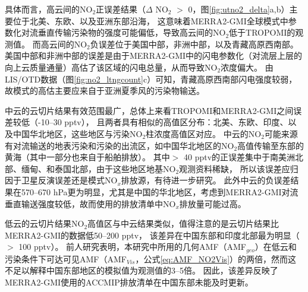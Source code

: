 具体而言，高云间的NO$_2$正误差结果（$\Delta$ NO$_2$ $>$ 0，图\ref{fig:utno2_delta}a,b）主要位于北美、东欧、以及亚洲东部沿海，
这意味着MERRA2-GMI全球模式中参数化对流垂直传输污染物的强度可能偏低，导致高云间的NO$_2$低于TROPOMI的观测值。
而高云间的NO$_2$负误差位于美国中部，非洲中部，以及青藏高原西南部。
美国中部和非洲中部的误差是由于MERRA2-GMI中的闪电参数化（对流层上层的向上云质量通量）高估了该区域的闪电总量，从而导致NO$_2$浓度偏大\citep{Allen.2002,Allen.2010}。
由LIS/OTD数据（图\ref{fig:no2_ltngcount}c）可知，青藏高原西南部闪电强度较弱，故模式的高估主要应来自于亚洲夏季风的污染物输送。

中云的云切片结果有效范围最广，总体上来看TROPOMI和MERRA2-GMI之间误差较低（-10--30 pptv），
且两者具有相似的高值区分布：北美、东欧、印度、以及中国华北地区，这些地区与污染NO$_2$柱浓度高值区对应。
中云的NO$_2$可能来源有对流输送的地表污染和污染的出流区，如中国华北地区的NO$_2$高值传输至东部的黄海（其中一部分也来自于船舶排放）。
其中$>$ 40 pptv的正误差集中于南美洲北部、缅甸、和泰国北部，由于这些地区地基NO$_2$观测资料稀缺，
所以该误差应归因于卫星反演误差还是模式NO$_x$排放源，有待进一步研究。
此外中云的负误差结果在570--670 hPa更为明显，尤其是中国的华北地区，考虑到MERRA2-GMI对流垂直输送强度较低，故而使用的排放清单中NO$_x$排放量可能过高\citep{Ziemke.2019}。

低云的云切片结果NO$_2$高值区与中云结果类似，值得注意的是云切片结果比MERRA2-GMI的数据低50--200 pptv，
该差异在中国东部和印度北部最为明显（$>$ 100 pptv）。
前人研究表明，本研究中所用的几何AMF（AMF$_{geo}$）在低云和污染条件下可达可见AMF（AMF$_{Vis}$，公式\ref{eq:AMF_NO2Vis}）的两倍\citep{BelmonteRivas.2015}，然而这不足以解释中国东部地区的模拟值为观测值的3--5倍。
因此，该差异反映了MERRA2-GMI使用的ACCMIP排放清单在中国东部未能及时更新。

